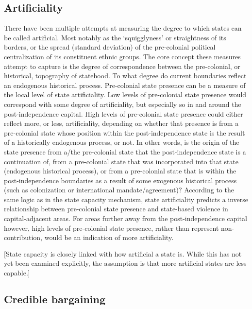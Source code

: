 \documentclass[12pt]{article}
\begin{document}
\subsection{Artificiality} \label{Artificiality}

There have been multiple attempts at measuring the degree to which states can be
called artificial. Most notably as the `squigglyness' or straightness of its
borders, or the spread (standard deviation) of the pre-colonial political
centralization of its constituent ethnic groups. The core concept these measures
attempt to capture is the degree of correspondence between the pre-colonial, or
historical, topography of statehood. To what degree do current boundaries
reflect an endogenous historical process. Pre-colonial state presence can be a
measure of the local level of state artificiality. Low levels of pre-colonial
state presence would correspond with some degree of artificiality, but
especially so in and around the post-independence capital. High levels of
pre-colonial state presence could either reflect more, or less, artificiality,
depending on whether that presence is from a pre-colonial state whose position
within the post-independence state is the result of a historically endogenous
process, or not. In other words, is the origin of the state presence from a/the
pre-colonial state that the post-independence state is a continuation of, from a
pre-colonial state that was incorporated into that state (endogenous historical
process), or from a pre-colonial state that is within the post-independence
boundaries as a result of some exogenous historical process (such as
colonization or international mandate/agreement)? According to the same logic as
in the state capacity mechanism, state artificiality predicts a inverse
relationship between pre-colonial state presence and state-based violence in
capital-adjacent areas. For areas further away from the post-independence
capital however, high levels of pre-colonial state presence, rather than
represent non-contribution, would be an indication of more artificiality. 

[State capacity is closely linked with how artificial a state is. While this has
not yet been examined explicitly, the assumption is that more artificial states
are less capable.]

\subsection{Credible bargaining} \label{Credible bargaining}
\end{document}
